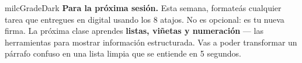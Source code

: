 \documentclass[11pt,letterpaper]{article}
\begin{document}
\begin{infoband}{milcGradeDark}
\textbf{Para la próxima sesión.} Esta semana, formateás cualquier tarea que entregues en digital usando los 8 atajos. No es opcional: es tu nueva firma. La próxima clase aprendes \textbf{listas, viñetas y numeración} --- las herramientas para mostrar información estructurada. Vas a poder transformar un párrafo confuso en una lista limpia que se entiende en 5 segundos.
\end{infoband}
\end{document}

